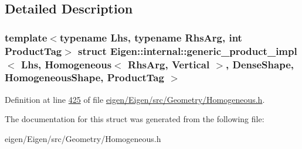 \subsection{Detailed Description}
\subsubsection*{template$<$typename Lhs, typename Rhs\+Arg, int Product\+Tag$>$\newline
struct Eigen\+::internal\+::generic\+\_\+product\+\_\+impl$<$ Lhs, Homogeneous$<$ Rhs\+Arg, Vertical $>$, Dense\+Shape, Homogeneous\+Shape, Product\+Tag $>$}



Definition at line \hyperlink{eigen_2_eigen_2src_2_geometry_2_homogeneous_8h_source_l00425}{425} of file \hyperlink{eigen_2_eigen_2src_2_geometry_2_homogeneous_8h_source}{eigen/\+Eigen/src/\+Geometry/\+Homogeneous.\+h}.



The documentation for this struct was generated from the following file\+:\begin{DoxyCompactItemize}
\item 
eigen/\+Eigen/src/\+Geometry/\+Homogeneous.\+h\end{DoxyCompactItemize}
